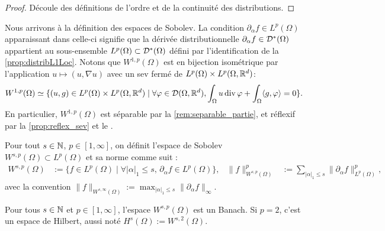 \begin{proof}
	Découle des définitions de l'ordre et de la continuité des distributions.
\end{proof}

Nous arrivons à la définition des espaces de Sobolev.
La condition $\partial_\alpha f \in L^p(\Omega)$ apparaissant dans celle-ci signifie que la dérivée distributionnelle $\partial_\alpha f \in \mathcal{D}^*(\Omega)$ appartient au sous-ensemble $L^p(\Omega) \subset \mathcal{D}^*(\Omega)$ défini par l'identification de la \cref{prop:distribL1Loc}. 
Notons que $W^{1,p}(\Omega)$ est en bijection isométrique par l'application $u \mapsto (u,\nabla u)$ avec un sev fermé de $L^p(\Omega) \times L^p(\Omega,\mathbb{R}^d)$: 
\begin{equation} %
\label{eq:W1p_sev_Lp}
	W^{1,p}(\Omega) \simeq \{(u,g)\in L^p(\Omega) \times L^p(\Omega,\bR^d) \mid \forall \vp \in \cD(\Omega,\bR^d), \int_\Omega u \diver \vp + \int_\Omega \<g,\vp\> = 0\}.
\end{equation}
%
En particulier, $W^{1,p}(\Omega)$ est séparable par la \cref{rem:separable_partie}, et réflexif par la \cref{prop:reflex_sev} et le .

\begin{definition}
\label{def:Sobolev}
%
	Pour tout $s \in \mathbb{N}$, $p \in [1,\infty]$, on définit l'espace de Sobolev $W^{s,p}(\Omega) \subset L^p(\Omega)$ et sa norme comme suit : 
	\begin{align*}
		W^{s,p}(\Omega) &:= \{f \in L^p(\Omega) \mid \forall |\alpha|_1 \leq s,\, \partial_\alpha f \in L^p(\Omega)\}, &
		\|f\|_{W^{s,p}(\Omega)}^p &:= \sum_{|\alpha|_1\leq s} \|\partial_\alpha f\|_{L^p(\Omega)}^p,
	\end{align*}
	avec la convention $\|f\|_{W^{s,\infty}(\Omega)} := \max_{|\alpha|_1 \leq s} \|\partial_\alpha f\|_\infty$.
\end{definition}


\begin{proposition}
\label{prop:SobolevBanach}
%
	Pour tous $s \in \mathbb{N}$ et $p \in [1,\infty]$, l'espace $W^{s,p}(\Omega)$ est un Banach. Si $p=2$, c'est un espace de Hilbert, aussi noté $H^s(\Omega) := W^{s,2}(\Omega)$.
\end{proposition}


